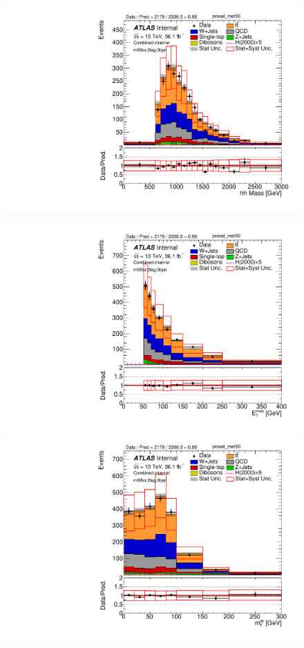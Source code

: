 \begin{figure}[!h]
\begin{center}
\includegraphics[scale=0.33]{./figures/boosted/PlotsInMbbCR/DataMC_2tag_0bjet_mbbcr_lepton_presel_met50_hhMassRebin1}
\par\medskip
\includegraphics[scale=0.33]{./figures/boosted/PlotsInMbbCR/DataMC_2tag_0bjet_mbbcr_lepton_presel_met50_MET}
\includegraphics[scale=0.33]{./figures/boosted/PlotsInMbbCR/DataMC_2tag_0bjet_mbbcr_lepton_presel_met50_WlepMtATLAS}

\end{center}
\end{figure}

